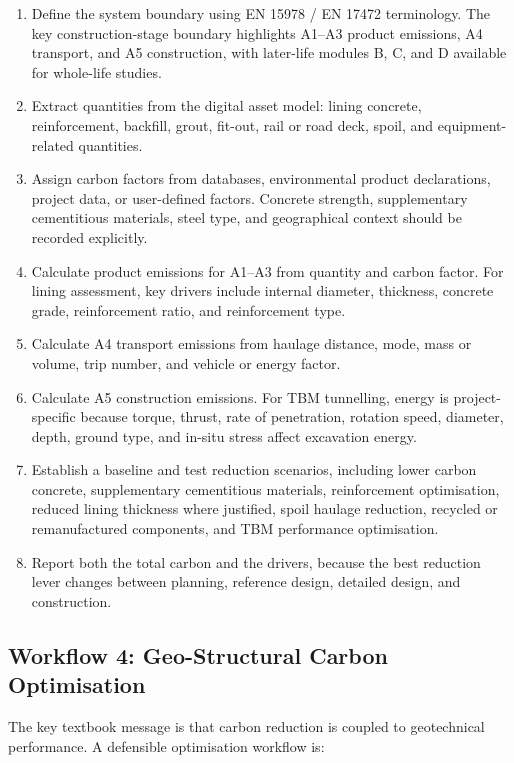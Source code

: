 \documentclass[11pt]{article}
\begin{document}
\begin{enumerate}
  \item Define the system boundary using EN 15978 / EN 17472 terminology. The
  key construction-stage boundary highlights A1--A3 product emissions, A4 transport, and A5 construction,
  with later-life modules B, C, and D available for whole-life studies.
  \item Extract quantities from the digital asset model: lining concrete,
  reinforcement, backfill, grout, fit-out, rail or road deck, spoil, and
  equipment-related quantities.
  \item Assign carbon factors from databases, environmental product
  declarations, project data, or user-defined factors. Concrete strength,
  supplementary cementitious materials, steel type, and geographical context
  should be recorded explicitly.
  \item Calculate product emissions for A1--A3 from quantity and carbon factor.
  For lining assessment, key drivers include internal diameter, thickness,
  concrete grade, reinforcement ratio, and reinforcement type.
  \item Calculate A4 transport emissions from haulage distance, mode, mass or
  volume, trip number, and vehicle or energy factor.
  \item Calculate A5 construction emissions. For TBM tunnelling, energy is
  project-specific because torque, thrust, rate of
  penetration, rotation speed, diameter, depth, ground type, and in-situ stress
  affect excavation energy.
  \item Establish a baseline and test reduction scenarios, including lower
  carbon concrete, supplementary cementitious materials, reinforcement
  optimisation, reduced lining thickness where justified, spoil haulage
  reduction, recycled or remanufactured components, and TBM performance
  optimisation.
  \item Report both the total carbon and the drivers, because the best reduction
  lever changes between planning, reference design, detailed design, and
  construction.
\end{enumerate}

\subsection{Workflow 4: Geo-Structural Carbon Optimisation}

The key textbook message is that carbon reduction is coupled to geotechnical
performance. A defensible optimisation workflow is:
\end{document}
